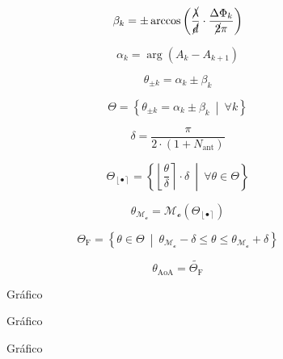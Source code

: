 \begin{equation} %
    \beta_{k} = \pm \arccos\left(\frac{\cancel{\lambda}}{\cancel{d}}\cdot\frac{\Delta\Phi_{k}}{\cancel{2}\pi}\right)
\end{equation}

\begin{equation} %
	\alpha_{k} = \arg\left( A_{k} - A_{k+1} \right)
\end{equation}

\begin{equation} %
	\theta_{\pm k} = \alpha_{k}\pm \beta_{k}
\end{equation}

\begin{equation} %
	\Theta = \left\{\theta_{\pm k}=\alpha_{k}\pm \beta_{k} ~\middle\vert~ \forall k\right\}
\end{equation}

\begin{equation} %
    \delta = \frac{\pi}{2 \cdot \left( 1 + N_\text{ant} \right)}
\end{equation}

\begin{equation} %
    \Theta_{\left\lfloor\bullet\right\rceil} =
    \left\{\left\lfloor\frac{\theta}{\delta}\right\rceil\cdot\delta ~\middle\vert~ \forall \theta \in \Theta  \right\}
\end{equation}

\begin{equation} %
    \theta_\mathcal{M_o} = \operatorname{\mathcal{M_o}}\left( \Theta_{\left\lfloor\bullet\right\rceil}  \right)
\end{equation}

\begin{equation} %
    \Theta_\text{F} = \left\{\theta \in \Theta  ~\middle\vert~
    \theta_\mathcal{M_o} - \delta \leq \theta \leq \theta_\mathcal{M_o} + \delta\right\}
\end{equation}

\begin{equation} %
    \theta_\text{AoA} = \widetilde{\Theta_\text{F}}
\end{equation}

\begin{figure}[H]
    \centering
    
    \caption{Gráfico}
\end{figure}

\begin{figure}[H]
    \centering
    
    \caption{Gráfico}
\end{figure}

\begin{figure}[H]
    \centering
    
    \caption{Gráfico}
\end{figure}
